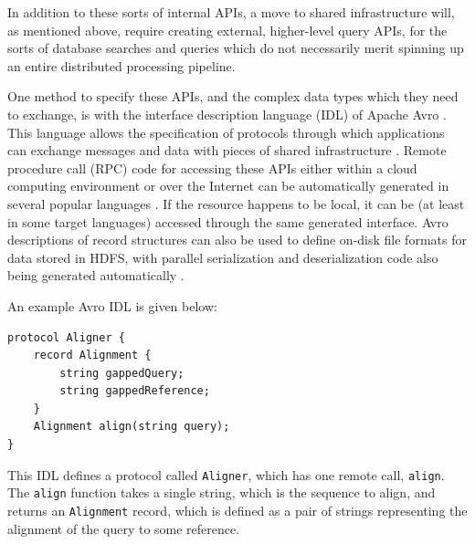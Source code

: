 \documentclass[11pt,proposal]{ucthesis}
\begin{document}
In addition to these sorts of internal APIs, a move to shared infrastructure will, as mentioned above, require creating external, higher-level query APIs, for the sorts of database searches and queries which do not necessarily merit spinning up an entire distributed processing pipeline.

One method to specify these APIs, and the complex data types which they need to exchange, is with the interface description language (IDL) of Apache Avro \cite{apache2014avro}. This language allows the specification of protocols through which applications can exchange messages and data with pieces of shared infrastructure \cite{apache2014avro}. Remote procedure call (RPC) code for accessing these APIs either within a cloud computing environment or over the Internet can be automatically generated in several popular languages \cite{apache2014avro}. If the resource happens to be local, it can be (at least in some target languages) accessed through the same generated interface. Avro descriptions of record structures can also be used to define on-disk file formats for data stored in HDFS, with parallel serialization and deserialization code also being generated automatically \cite{massie2013powerful}. 

An example Avro IDL is given below:

\begin{lstlisting}[basicstyle=\ttfamily, frame=single]
protocol Aligner {
    record Alignment {
        string gappedQuery;
        string gappedReference;
    }
    Alignment align(string query);
}
\end{lstlisting}

This IDL defines a protocol called \texttt{Aligner}, which has one remote call, \texttt{align}. The \texttt{align} function takes a single string, which is the sequence to align, and returns an \texttt{Alignment} record, which is defined as a pair of strings representing the alignment of the query to some reference.


    
        
        
        
\end{document}
